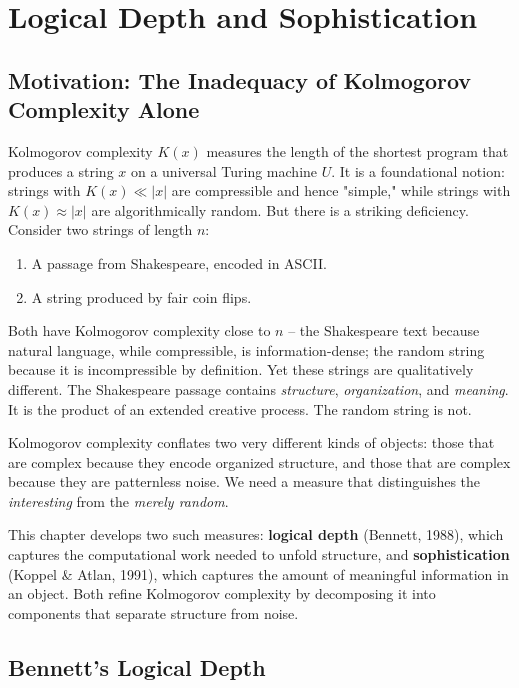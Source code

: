 \chapter{Logical Depth and Sophistication}

\section{Motivation: The Inadequacy of Kolmogorov Complexity Alone}

Kolmogorov complexity $K(x)$ measures the length of the shortest program that produces a string $x$ on a universal Turing machine $U$. It is a foundational notion: strings with $K(x) \ll |x|$ are compressible and hence "simple," while strings with $K(x) \approx |x|$ are algorithmically random. But there is a striking deficiency. Consider two strings of length $n$:

\begin{enumerate}
\item A passage from Shakespeare, encoded in ASCII.
\item A string produced by fair coin flips.
\end{enumerate}

Both have Kolmogorov complexity close to $n$ -- the Shakespeare text because natural language, while compressible, is information-dense; the random string because it is incompressible by definition. Yet these strings are qualitatively different. The Shakespeare passage contains \textit{structure}, \textit{organization}, and \textit{meaning}. It is the product of an extended creative process. The random string is not.

Kolmogorov complexity conflates two very different kinds of objects: those that are complex because they encode organized structure, and those that are complex because they are patternless noise. We need a measure that distinguishes the \textit{interesting} from the \textit{merely random}.

This chapter develops two such measures: \textbf{logical depth} (Bennett, 1988), which captures the computational work needed to unfold structure, and \textbf{sophistication} (Koppel \& Atlan, 1991), which captures the amount of meaningful information in an object. Both refine Kolmogorov complexity by decomposing it into components that separate structure from noise.

\section{Bennett's Logical Depth}

